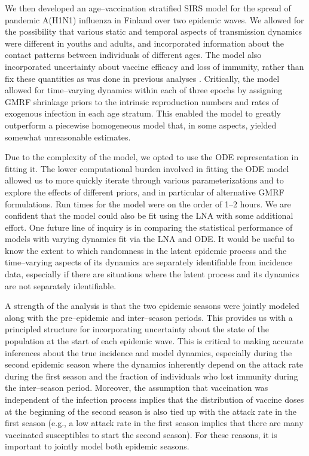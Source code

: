 We then developed an age--vaccination stratified SIRS model for the spread of pandemic A(H1N1) influenza in Finland over two epidemic waves. We allowed for the possibility that various static and temporal aspects of transmission dynamics were different in youths and adults, and incorporated information about the contact patterns between individuals of different ages. The model also incorporated uncertainty about vaccine efficacy and loss of immunity, rather than fix these quantities as was done in previous analyses \cite{shubin2016revealing}. Critically, the model allowed for time--varying dynamics within each of three epochs by assigning GMRF shrinkage priors to the intrinsic reproduction numbers and rates of exogenous infection in each age stratum. This enabled the model to greatly outperform a piecewise homogeneous model that, in some aspects, yielded somewhat unreasonable estimates. 

Due to the complexity of the model, we opted to use the ODE representation in fitting it. The lower computational burden involved in fitting the ODE model allowed us to more quickly iterate through various  parameterizations and to explore the effects of different priors, and in particular of alternative GMRF formulations. Run times for the model were on the order of 1--2 hours. We are confident that the model could also be fit using the LNA with some additional effort. One future line of inquiry is in comparing the statistical performance of models with varying dynamics fit via the LNA and ODE. It would be useful to know the extent to which randomness in the latent epidemic process and the time--varying aspects of its dynamics are separately identifiable from incidence data, especially if there are situations where the latent process and its dynamics are not separately identifiable.

A strength of the analysis is that the two epidemic seasons were jointly modeled along with the pre--epidemic and inter--season periods. This provides us with a principled structure for incorporating uncertainty about the state of the population at the start of each epidemic wave. This is critical to making accurate inferences about the true incidence and model dynamics, especially during the second epidemic season where the dynamics inherently depend on the attack rate during the first season and the fraction of individuals who lost immunity during the inter--season period. Moreover, the assumption that vaccination was independent of the infection process implies that the distribution of vaccine doses at the beginning of the second season is also tied up with the attack rate in the first season (e.g., a low attack rate in the first season implies that there are many vaccinated susceptibles to start the second season). For these reasons, it is important to jointly model both epidemic seasons.


